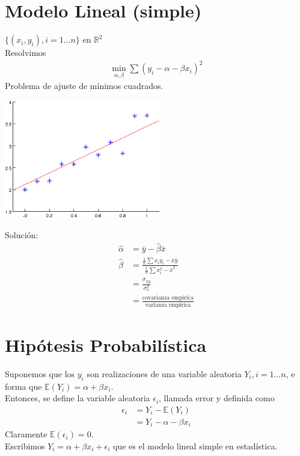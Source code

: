 \documentclass[10pt]{article}
\theoremstyle{plain}
\theoremstyle{definition}
\begin{document}
\section{Modelo Lineal (simple)}
$\{(x_{i},y_{i}), i = 1\ldots n\}$ en $\mathbb{R}^2$\\
Resolvimos
\begin{align*}
\min_{\alpha, \beta} \sum (y_{i}-\alpha -\beta x_{i})^2
\end{align*}
Problema de ajuste de mínimos cuadrados.
\begin{center}
\includegraphics[scale=1]{imagenes/minimosCuadradosLineal.png}
\end{center}
Solución:
\begin{align*}
 \hat{\alpha} &= \bar{y} - \hat{\beta}\bar{x}\\
 \hat{\beta} &= \frac{\frac{1}{n}\sum x_{i}y_{i}- \bar{x}\bar{y}}{\frac{1}{n}\sum x_{i}^2 - \bar{x}^2}\\
 &= \frac{\sigma_{xy}}{\sigma_{x}^2}\\
 &= \frac{\text{covarianza empírica}}{\text{varianza empírica}}
\end{align*}
\section{Hipótesis Probabilística}
Suponemos que los $y_{i}$ son realizaciones de una variable aleatoria $Y_{i}, i = 1\ldots n$, e forma que $\mathbb{E}(Y_{i}) = \alpha + \beta x_{i}$.\\

Entonces, se define la variable aleatoria $\epsilon_{i}$, llamada error y definida como
\begin{align*}
\epsilon_{i} &= Y_{i} - \mathbb{E}(Y_{i})\\
&= Y_{i} - \alpha - \beta x_{i}
\end{align*}
Claramente $\mathbb{E}(\epsilon_{i}) = 0$.\\

Escribimos $Y_{i} = \alpha + \beta x_{i} + \epsilon_{i}$ que es el modelo lineal simple en estadística.\\
\end{document}
